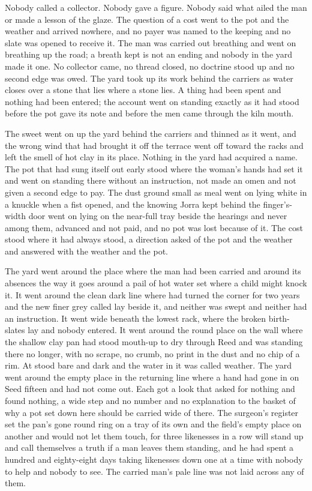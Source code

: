 Nobody called a collector. Nobody gave a figure. Nobody said what ailed the man or made a lesson of the glaze. The question of a cost went to the pot and the weather and arrived nowhere, and no payer was named to the keeping and no slate was opened to receive it. The man was carried out breathing and went on breathing up the road; a breath kept is not an ending and nobody in the yard made it one. No collector came, no thread closed, no doctrine stood up and no second edge was owed. The yard took up its work behind the carriers as water closes over a stone that lies where a stone lies. A thing had been spent and nothing had been entered; the account went on standing exactly as it had stood before the pot gave its note and before the men came through the kiln mouth.

The sweet went on up the yard behind the carriers and thinned as it went, and the wrong wind that had brought it off the terrace went off toward the racks and left the smell of hot clay in its place. Nothing in the yard had acquired a name. The pot that had sung itself out early stood where the woman's hands had set it and went on standing there without an instruction, not made an omen and not given a second edge to pay. The dust ground small as meal went on lying white in a knuckle when a fist opened, and the knowing Jorra kept behind the finger's-width door went on lying on the near-full tray beside the hearings and never among them, advanced and not paid, and no pot was lost because of it. The cost stood where it had always stood, a direction asked of the pot and the weather and answered with the weather and the pot.

The yard went around the place where the man had been carried and around its absences the way it goes around a pail of hot water set where a child might knock it. It went around the clean dark line where  had turned the corner for two years and the new finer grey called  lay beside it, and neither was swept and neither had an instruction. It went wide beneath the lowest rack, where the broken birth-slates lay and nobody entered. It went around the round place on the wall where the shallow clay pan had stood mouth-up to dry through Reed and was standing there no longer, with no scrape, no crumb, no print in the dust and no chip of a rim. At   stood bare and dark and the water in it was called weather. The yard went around the empty place in the returning line where a hand had gone in on Seed fifteen and had not come out. Each got a look that asked for nothing and found nothing, a wide step and no number and no explanation to the basket of why a pot set down here should be carried wide of there. The surgeon's register set the pan's gone round ring on a tray of its own and the field's empty place on another and would not let them touch, for three likenesses in a row will stand up and call themselves a truth if a man leaves them standing, and he had spent a hundred and eighty-eight days taking likenesses down one at a time with nobody to help and nobody to see. The carried man's pale line was not laid across any of them.

